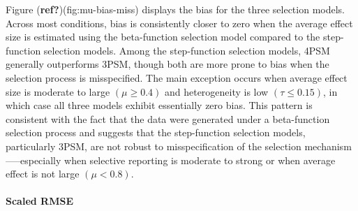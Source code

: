 \documentclass[
]{article}
\begin{document}
Figure (\textbf{ref?})(fig:mu-bias-miss) displays the bias for the three
selection models. Across most conditions, bias is consistently closer to
zero when the average effect size is estimated using the beta-function
selection model compared to the step-function selection models. Among
the step-function selection models, 4PSM generally outperforms 3PSM,
though both are more prone to bias when the selection process is
misspecified. The main exception occurs when average effect size is
moderate to large \((\mu \geq 0.4)\) and heterogeneity is low
\((\tau \leq 0.15)\), in which case all three models exhibit essentially
zero bias. This pattern is consistent with the fact that the data were
generated under a beta-function selection process and suggests that the
step-function selection models, particularly 3PSM, are not robust to
misspecification of the selection mechanism-----especially when
selective reporting is moderate to strong or when average effect is not
large \((\mu < 0.8)\).

\paragraph{Scaled RMSE}\label{scaled-rmse-1}
\end{document}

